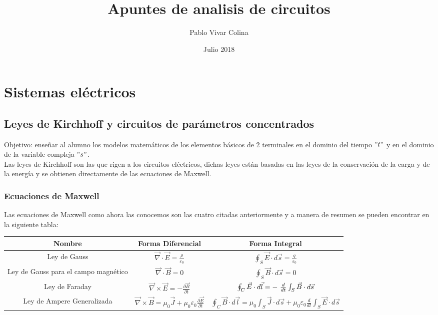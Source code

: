 \documentclass[]{article}
\title{Apuntes de analisis de circuitos}
\author{Pablo Vivar Colina}
\date{Julio 2018}
\begin{document}
\maketitle

\section{Sistemas eléctricos}

\subsection{Leyes de Kirchhoff y circuitos de parámetros concentrados}

Objetivo: enseñar al alumno los modelos matemáticos de los elementos básicos de 2 terminales en el dominio del tiempo $"t"$ y en el dominio de la variable compleja $"s"$.\\

Las leyes de Kirchhoff son las que rigen a los circuitos eléctricos, dichas leyes están basadas en las leyes de la conservación de la carga y de la energía  y se obtienen directamente de las ecuaciones de Maxwell.\\  

\subsubsection{Ecuaciones de Maxwell}

Las ecuaciones de Maxwell como ahora las conocemos son las cuatro citadas anteriormente y a manera de resumen se pueden encontrar en la siguiente tabla:\\


\begin{table}[h!]
	\begin{tabular}{|c|c|c|}
		\hline
		Nombre                               & Forma Diferencial & Forma Integral \\ \hline
		Ley de Gauss                         &     $\vec{\nabla} \cdot \vec{E} = \frac{\rho}{\varepsilon_0}$              &  $\oint_{S} \vec{E} \cdot d\vec{s} = \frac {q}{\varepsilon_0}$              \\ \hline
		Ley de Gauss para el campo magnético &  $\vec{\nabla} \cdot \vec{B} = 0$                 &    $\oint_S \vec{B} \cdot d\vec{s} = 0$            \\ \hline
		Ley de Faraday                       &   $\vec{\nabla} \times \vec{E} = - \frac{\partial \vec{B}}{\partial t}$                &     $\oint_C \vec{E} \cdot d\vec{l} =  - \ { d \over dt } \int_{S} \vec{B} \cdot d\vec{s}$           \\ \hline
		Ley de Ampere Generalizada           &  $\vec{\nabla} \times \vec{B} = \mu_0 \vec{J} + \mu_0 \varepsilon_0  \frac{\partial \vec{E}}{\partial t}$                 &  $\oint_C \vec{B} \cdot d\vec{l} = \mu_0 \int_S \vec{J} \cdot d\vec{s} + \mu_0 \varepsilon_0 \frac{d}{dt} \int_S \vec{E} \cdot d\vec{s}$              \\ \hline
	\end{tabular}
\end{table}
\end{document}
